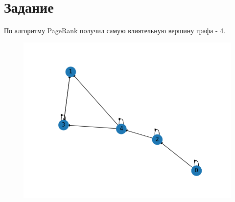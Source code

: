 \section{Задание}

По алгоритму PageRank получил самую влиятельную вершину графа - 4.


\begin{figure}[H]
    \centering
    \includegraphics[trim={0 0 0 0},clip,width=\textwidth]{Imgs/graph.png}
    \label{graph}
\end{figure}





